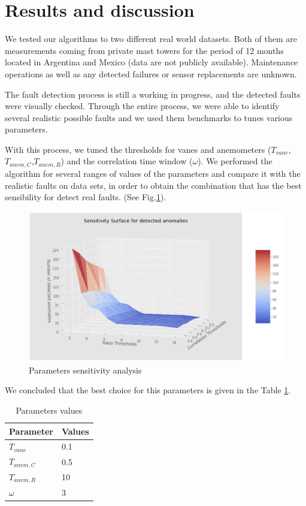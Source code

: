 \documentclass[conference]{IEEEtran}
\begin{document}
\section{Results and discussion}\label{sec:results}
We tested our algorithms to two different real world datasets. Both of them are measurements coming from private mast towers for the period of 12 months located in Argentina and Mexico (data are not publicly available). Maintenance operations as well as any detected failures or sensor replacements are unknown.

The fault detection process is still a working in progress, and the detected faults were visually checked. Through the entire process, we were able to identify several realistic possible faults and we used them benchmarks to tunes various parameters.

With this process, we tuned the thresholds for vanes and anemometers ($T_{vane}$,$T_{anem,C}$,$T_{anem,R}$) and the correlation time window ($\omega$). We performed the algorithm for several ranges of values of the parameters and compare it with the realistic faults on data sets, in order to obtain the combination that has the best sensibility for detect real faults. (See Fig.\ref{fig:parametersAnalysis}).

\begin{figure}[h]
	\centering
	\includegraphics[width=\columnwidth]{Images/SensitivityAnalysis2.png}
	\caption{Parameters sensitivity analysis}
	\label{fig:parametersAnalysis}
\end{figure}

We concluded that the best choice for this parameters is given in the Table \ref{table:parameterChoice}.
\begin{table}[h]
\begin{center}
	\begin{tabular}{ |l|l| } 
	 \hline
	 Parameter & Values  \\ 
	 \hline
	 $T_{vane}$ & 0.1\\
	 $T_{anem,C}$ &0.5\\
	 $T_{anem,R}$ & 10 \\ 
	 $\omega$ & 3 \\
	 \hline
	\end{tabular}
\caption{Parameters values}
\label{table:parameterChoice}
\end{center}
\end{table}
\end{document}
